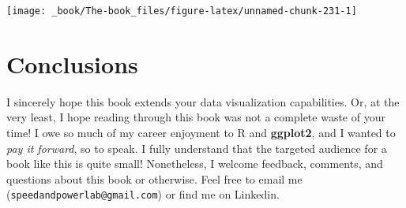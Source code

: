 \documentclass[
]{book}
\begin{document}
\begin{center}\texttt{[image: \_book/The-book\_files/figure-latex/unnamed-chunk-231-1]} \end{center}

\hypertarget{conclusions}{%
\chapter{Conclusions}\label{conclusions}}

I sincerely hope this book extends your data visualization capabilities. Or, at the very least, I hope reading through this book was not a complete waste of your time! I owe so much of my career enjoyment to R and \textbf{ggplot2}, and I wanted to \emph{pay it forward}, so to speak. I fully understand that the targeted audience for a book like this is quite small! Nonetheless, I welcome feedback, comments, and questions about this book or otherwise. Feel free to email me (\texttt{speedandpowerlab@gmail.com}) or find me on Linkedin.

  
\end{document}
